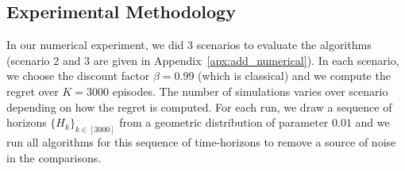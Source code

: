 \subsection{Experimental Methodology}
\label{ssec:experimental_methodo}

In our numerical experiment, we did 3 scenarios to evaluate the algorithms (scenario 2 and 3 are given in Appendix~\ref{apx:add_numerical}). In each scenario, we choose the discount factor $\beta=0.99$ (which is classical) and we compute the regret over $K=3000$ episodes. The number of simulations varies over scenario depending on how the regret is computed. For each run, we draw a sequence of horizons $\{H_k\}_{k\in[3000]}$ from a geometric distribution of parameter $0.01$ and we run all algorithms for this sequence of time-horizons to remove a source of noise in the comparisons.  

